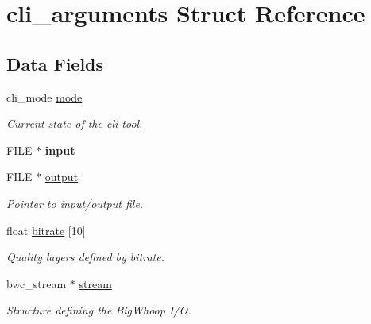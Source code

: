 \hypertarget{structcli__arguments}{}\section{cli\+\_\+arguments Struct Reference}
\label{structcli__arguments}
\subsection*{Data Fields}
\begin{DoxyCompactItemize}
\item 
\mbox{\label{structcli__arguments_a67ba0ee3e767eb794c0078a6d09e0790}} 
cli\+\_\+mode \mbox{\hyperlink{structcli__arguments_a67ba0ee3e767eb794c0078a6d09e0790}{mode}}
\begin{DoxyCompactList}\small\item\em Current state of the cli tool. \end{DoxyCompactList}\item 
\mbox{\label{structcli__arguments_abfae665d56d61e1c21831bec369abd34}} 
F\+I\+LE $\ast$ {\bfseries input}
\item 
\mbox{\label{structcli__arguments_ac97f1fad19b04ead2930cb355b460869}} 
F\+I\+LE $\ast$ \mbox{\hyperlink{structcli__arguments_ac97f1fad19b04ead2930cb355b460869}{output}}
\begin{DoxyCompactList}\small\item\em Pointer to input/output file. \end{DoxyCompactList}\item 
\mbox{\label{structcli__arguments_a41a59882021a55065a0183349a4af2a2}} 
float \mbox{\hyperlink{structcli__arguments_a41a59882021a55065a0183349a4af2a2}{bitrate}} \mbox{[}10\mbox{]}
\begin{DoxyCompactList}\small\item\em Quality layers defined by bitrate. \end{DoxyCompactList}\item 
\mbox{\label{structcli__arguments_a10b9cae746af10bc5a948c1b59d2374b}} 
bwc\+\_\+stream $\ast$ \mbox{\hyperlink{structcli__arguments_a10b9cae746af10bc5a948c1b59d2374b}{stream}}
\begin{DoxyCompactList}\small\item\em Structure defining the Big\+Whoop I/O. \end{DoxyCompactList}\item 

\end{DoxyCompactItemize}
